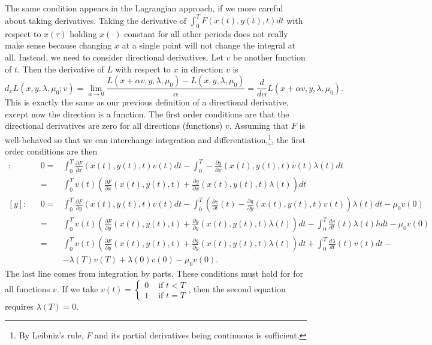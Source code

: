 The same condition appears in the Lagrangian approach, if we more
careful about taking derivatives. Taking the derivative of $\int_0^T
F(x(t),y(t),t) dt$ with respect to $x(\tau)$ holding $x(\cdot)$
constant for all other periods does not really make sense because
changing $x$ at a single point will not change the integral at
all. Instead, we need to consider directional derivatives. Let $v$ be
another function of $t$. Then the derivative of $L$ with respect to
$x$ in direction $v$ is
\[ d_xL(x,y,\lambda,\mu_0;v) = \lim_{\alpha \to 0} \frac{L(x + \alpha
  v, y, \lambda, \mu_0) - L(x,y,\lambda,\mu_0)}{\alpha} =
\frac{d}{d\alpha} L(x+\alpha v, y, \lambda, \mu_0). \] This is exactly
the same as our previous definition of a directional derivative,
except now the direction is a function. The first order conditions are
that the directional derivatives are zero for all directions
(functions) $v$. Assuming that $F$ is well-behaved so that we can
interchange integration and differentiation,\footnote{By Leibniz's
  rule, $F$ and its partial derivatives being continuous is
  sufficient.}, the first order conditions are then 
\begin{align*}
  [x]:&& 0 = & \int_0^T \frac{\partial F}{\partial x}(x(t),y(t),t) v(t) dt -
  \int_0^T -\frac{\partial g}{\partial x}(x(t),y(t),t) v(t) \lambda(t)
  dt \\ 
  && = & \int_0^T v(t) \left(\frac{\partial F}{\partial x}(x(t),y(t),t) +
    \frac{\partial g}{\partial x}(x(t),y(t),t) \lambda(t)\right) dt \\
  [y]:&& 0 = & \int_0^T \frac{\partial F}{\partial
    y}(x(t),y(t),t) v(t) dt - 
  \int_0^T \left(\frac{\partial v}{\partial t}(t) -\frac{\partial
      g}{\partial y}(x(t),y(t),t) v(t)\right) \lambda(t)  dt  - \mu_0v(0)\\
  && = & \int_0^T v(t) \left(\frac{\partial F}{\partial
      y}(x(t),y(t),t) + \frac{\partial g}{\partial y}(x(t),y(t),t)
    \lambda(t)  \right)dt - \int_0^T \frac{dv}{dt}(t)\lambda(t)
h  dt  - \mu_0v(0)\\
  && = & \int_0^T v(t) \left(\frac{\partial F}{\partial
      y}(x(t),y(t),t) + \frac{\partial g}{\partial y}(x(t),y(t),t)
    \lambda(t)  \right)dt + \int_0^T \frac{d\lambda}{dt}(t)v(t)dt -
  \\ 
  &&  & - \lambda(T)v(T) + \lambda(0)v(0)  - \mu_0v(0).
\end{align*}
The last line comes from integration by parts.  These conditions must
hold for for all functions $v$. If we take $v(t) = \begin{cases} 0 &
  \text{ if  }t<T\\
  1 & \text{ if } t=T \end{cases}$, then the second equation requires
$\lambda(T)=0$.

